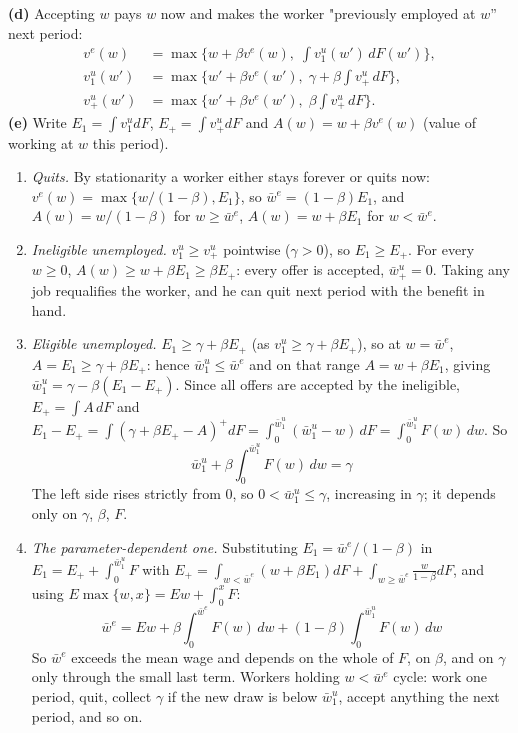 \documentclass[12pt, letterpaper]{article}
\newcommand{\wb}{\bar w}
\begin{document}
\begin{tcolorbox}[evenbox,title={Exercise 6.14 \quad Temporary Unemployment Compensation}]
\textbf{(d)} Accepting $w$ pays $w$ now and makes the worker "previously employed at $w$'' next period:
\[
\boxed{\begin{aligned}
v^e(w)&=\max\Big\{w+\beta v^e(w),\;\int v^u_1(w')\,dF(w')\Big\},\\
v^u_1(w')&=\max\Big\{w'+\beta v^e(w'),\;\gamma+\beta\int v^u_+\,dF\Big\},\\
v^u_+(w')&=\max\Big\{w'+\beta v^e(w'),\;\beta\int v^u_+\,dF\Big\}.
\end{aligned}}
\]
\textbf{(e)} Write $E_1=\int v^u_1dF$, $E_+=\int v^u_+dF$ and $A(w)=w+\beta v^e(w)$ (value of working at $w$ this
period).
\begin{enumerate}[label=\arabic*.,itemsep=3pt]
\item \emph{Quits.} By stationarity a worker either stays forever or quits now:
$v^e(w)=\max\{w/(1-\beta),E_1\}$, so $\boxed{\wb^e=(1-\beta)E_1}$, and
$A(w)=w/(1-\beta)$ for $w\ge\wb^e$, $A(w)=w+\beta E_1$ for $w<\wb^e$.
\item \emph{Ineligible unemployed.} $v^u_1\ge v^u_+$ pointwise ($\gamma>0$), so $E_1\ge E_+$. For every $w\ge0$,
$A(w)\ge w+\beta E_1\ge\beta E_+$: every offer is accepted, $\boxed{\wb^u_+=0}$. Taking any job requalifies the
worker, and he can quit next period with the benefit in hand.
\item \emph{Eligible unemployed.} $E_1\ge\gamma+\beta E_+$ (as $v^u_1\ge\gamma+\beta E_+$), so at $w=\wb^e$,
$A=E_1\ge\gamma+\beta E_+$: hence $\wb^u_1\le\wb^e$ and on that range $A=w+\beta E_1$, giving
$\wb^u_1=\gamma-\beta(E_1-E_+)$. Since all offers are accepted by the ineligible, $E_+=\int A\,dF$ and
$E_1-E_+=\int(\gamma+\beta E_+-A)^+dF=\int_0^{\wb^u_1}(\wb^u_1-w)\,dF=\int_0^{\wb^u_1}F(w)\,dw$. So
\[
\boxed{\wb^u_1+\beta\int_0^{\wb^u_1}F(w)\,dw=\gamma}
\]
The left side rises strictly from $0$, so $0<\wb^u_1\le\gamma$, increasing in $\gamma$; it depends only on
$\gamma$, $\beta$, $F$.
\item \emph{The parameter-dependent one.} Substituting $E_1=\wb^e/(1-\beta)$ in
$E_1=E_++\int_0^{\wb^u_1}F$ with $E_+=\int_{w<\wb^e}(w+\beta E_1)dF+\int_{w\ge\wb^e}\frac{w}{1-\beta}dF$, and using
$E\max\{w,x\}=Ew+\int_0^xF$:
\[
\boxed{\wb^e=Ew+\beta\int_0^{\wb^e}F(w)\,dw+(1-\beta)\int_0^{\wb^u_1}F(w)\,dw}
\]
So $\wb^e$ exceeds the mean wage and depends on the whole of $F$, on $\beta$, and on $\gamma$ only through the
small last term. Workers holding $w<\wb^e$ cycle: work one period, quit, collect $\gamma$ if the new draw is below
$\wb^u_1$, accept anything the next period, and so on.
\end{enumerate}


\end{tcolorbox}
\end{document}
